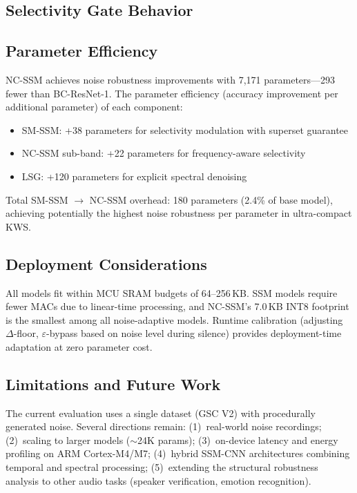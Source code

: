 \documentclass[journal]{IEEEtran}
\begin{document}
\subsection{Selectivity Gate Behavior}


\subsection{Parameter Efficiency}

NC-SSM achieves noise robustness improvements with 7{,}171 parameters---293 fewer than BC-ResNet-1.
The parameter efficiency (accuracy improvement per additional parameter) of each component:
\begin{itemize}
\setlength\itemsep{0pt}
\item SM-SSM: +38 parameters for selectivity modulation with superset guarantee
\item NC-SSM sub-band: +22 parameters for frequency-aware selectivity
\item LSG: +120 parameters for explicit spectral denoising
\end{itemize}
Total SM-SSM $\to$ NC-SSM overhead: 180 parameters (2.4\% of base model), achieving potentially the highest noise robustness per parameter in ultra-compact KWS.

\subsection{Deployment Considerations}

All models fit within MCU SRAM budgets of 64--256\,KB.
SSM models require fewer MACs due to linear-time processing, and NC-SSM's 7.0\,KB INT8 footprint is the smallest among all noise-adaptive models.
Runtime calibration (adjusting $\Delta$-floor, $\varepsilon$-bypass based on noise level during silence) provides deployment-time adaptation at zero parameter cost.

\subsection{Limitations and Future Work}

The current evaluation uses a single dataset (GSC V2) with procedurally generated noise.
Several directions remain:
(1)~real-world noise recordings;
(2)~scaling to larger models ($\sim$24K params);
(3)~on-device latency and energy profiling on ARM Cortex-M4/M7;
(4)~hybrid SSM-CNN architectures combining temporal and spectral processing;
(5)~extending the structural robustness analysis to other audio tasks (speaker verification, emotion recognition).
\end{document}

